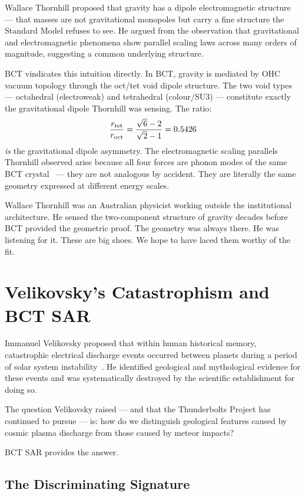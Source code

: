 \documentclass[twocolumn,10pt]{article}
\begin{document}
Wallace Thornhill proposed that gravity has a dipole electromagnetic
structure --- that masses are not gravitational monopoles but carry
a fine structure the Standard Model refuses to see. He argued from
the observation that gravitational and electromagnetic phenomena show
parallel scaling laws across many orders of magnitude, suggesting
a common underlying structure.

BCT vindicates this intuition directly. In BCT, gravity is mediated
by OHC vacuum topology through the oct/tet void dipole structure.
The two void types --- octahedral (electroweak) and tetrahedral
(colour/SU3) --- constitute exactly the gravitational dipole
Thornhill was sensing. The ratio:
%
\begin{equation}
\frac{r_{\rm tet}}{r_{\rm oct}} = \frac{\sqrt{6}-2}{\sqrt{2}-1} = 0.5426
\end{equation}
%
\textit{is} the gravitational dipole asymmetry. The electromagnetic
scaling parallels Thornhill observed arise because all four forces
are phonon modes of the same BCT crystal~\cite{bct_l57} --- they
are not analogous by accident. They are literally the same geometry
expressed at different energy scales.

Wallace Thornhill was an Australian physicist working outside the
institutional architecture. He sensed the two-component structure
of gravity decades before BCT provided the geometric proof.
The geometry was always there. He was listening for it.
These are big shoes. We hope to have laced them worthy of the fit.

\section{Velikovsky's Catastrophism and BCT SAR}

Immanuel Velikovsky proposed that within human historical memory,
catastrophic electrical discharge events occurred between planets
during a period of solar system instability~\cite{velikovsky}.
He identified geological and mythological evidence for these events
and was systematically destroyed by the scientific establishment
for doing so.

The question Velikovsky raised --- and that the Thunderbolts Project
has continued to pursue --- is: how do we distinguish geological
features caused by cosmic plasma discharge from those caused by
meteor impacts?

BCT SAR provides the answer.

\subsection{The Discriminating Signature}
\end{document}
